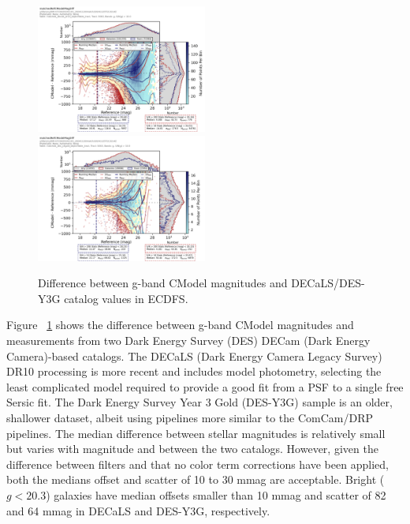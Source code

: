 \begin{figure}
  \includegraphics[width=0.5\textwidth]{galaxy_photometry/cdfs_g_vs_DECaLS.png}
  \includegraphics[width=0.5\textwidth]{galaxy_photometry/cdfs_g_vs_desy3g.png}
  \caption{Difference between g-band CModel magnitudes and DECaLS/DES-Y3G catalog values in ECDFS.}
  \label{fig:cdfs_g_vs_des}
\end{figure}

Figure ~\ref{fig:cdfs_g_vs_des} shows the difference between g-band CModel magnitudes and measurements from two Dark Energy Survey (DES) DECam (Dark Energy Camera)-based catalogs.
The DECaLS (Dark Energy Camera Legacy Survey) DR10 processing is more recent and includes model photometry, selecting the least complicated model required to provide a good fit from a PSF to a single free Sersic fit.
The Dark Energy Survey Year 3 Gold (DES-Y3G) sample is an older, shallower dataset, albeit using pipelines more similar to the ComCam/DRP pipelines.
The median difference between stellar magnitudes is relatively small but varies with magnitude and between the two catalogs.
However, given the difference between filters and that no color term corrections have been applied, both the medians offset and scatter of 10 to 30 mmag are acceptable.
Bright ($g < 20.3$) galaxies have median offsets smaller than 10 mmag and scatter of 82 and 64 mmag in DECaLS and DES-Y3G, respectively.

